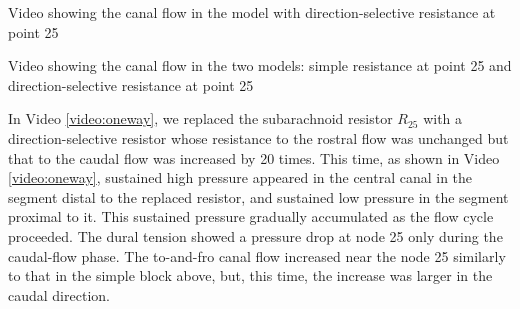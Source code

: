 \documentclass[fleqn,10pt]{wlscirep}
\begin{document}
\begin{video}[hbt]
    \caption{Video showing the canal flow in the model with
    direction-selective resistance at point 25}
    \label{video:canal_flow_oneway}
\end{video}

\begin{video}[hbt]
    \caption{Video showing the canal flow in the two models: simple
    resistance at point 25 and direction-selective resistance at point 25}
    \label{video:canal_comparison}
\end{video}

In Video \ref{video:oneway}, we replaced the subarachnoid resistor $R_{25}$
with a direction-selective resistor whose resistance to the rostral flow
was unchanged but that to the caudal flow was increased by 20 times.  This
time, as shown in Video \ref{video:oneway}, sustained high pressure
appeared in the central canal in the segment distal to the replaced
resistor, and sustained low pressure in the segment proximal to it.  This
sustained pressure gradually accumulated as the flow cycle proceeded.  The
dural tension showed a pressure drop at node 25 only during the caudal-flow
phase.  The to-and-fro canal flow increased near the node 25 similarly to
that in the simple block above, but, this time, the increase was larger in
the caudal direction.  
\end{document}
